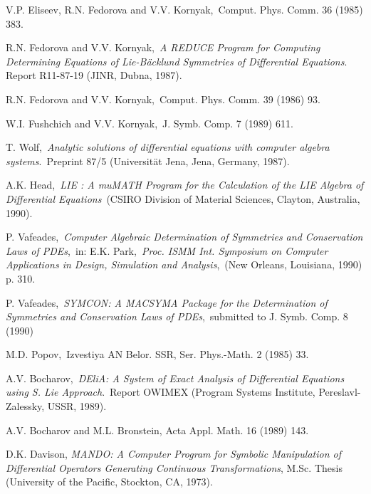 {\begin{thebibliography}{99}
 {\sc V.P. Eliseev, R.N. Fedorova} and
{\sc V.V. Kornyak},\, Comput. Phys. Comm. 36 (1985) 383.

 {\sc R.N. Fedorova} and
{\sc V.V. Kornyak},\,
{\em A REDUCE Program for Computing Determining Equations of 
Lie-B\"{a}cklund Symmetries of Differential Equations}.\,
Report R11-87-19 (JINR, Dubna, 1987).

 {\sc R.N. Fedorova} and
{\sc V.V. Kornyak},\, Comput. Phys. Comm. 39 (1986) 93.

 {\sc W.I. Fushchich} and
{\sc V.V. Kornyak},\, J. Symb. Comp. 7 (1989) 611.

 {\sc T. Wolf},\,
{\em Analytic solutions of differential equations with computer algebra
systems}.\,
Preprint 87/5 (Universit\"{a}t Jena, Jena, Germany, 1987).

 {\sc A.K. Head},\, {\em LIE : A muMATH Program
for the Calculation of the LIE Algebra of Differential Equations}\,
(CSIRO Division of Material Sciences, Clayton, Australia, 1990).

 {\sc P. Vafeades},\, {\em Computer Algebraic
Determination of Symmetries and Conservation Laws of PDEs},\,
in: E.K. Park,\, {\em Proc. ISMM Int. Symposium on Computer Applications 
in Design, Simulation and Analysis},\,
(New Orleans, Louisiana, 1990)\, p. 310.

 {\sc P. Vafeades},\, {\em SYMCON: A MACSYMA
Package for the Determination of Symmetries and Conservation Laws of PDEs},\,
submitted to J. Symb. Comp. 8 (1990)

 {\sc M.D. Popov},\,
Izvestiya AN Belor. SSR, Ser. Phys.-Math. 2 (1985) 33.

 {\sc A.V. Bocharov},\,
{\em DEliA: A System of Exact Analysis of Differential Equations using
S. Lie Approach}.\, Report OWIMEX (Program Systems Institute, 
Pereslavl-Zalessky, USSR, 1989).

 {\sc A.V. Bocharov} and 
{\sc M.L. Bronstein}, Acta Appl. Math. 16 (1989) 143.

 {\sc D.K. Davison}, 
{\em MANDO: A Computer Program for Symbolic Manipulation of Differential
Operators Generating Continuous Transformations}, 
M.Sc. Thesis (University of the Pacific, Stockton, CA, 1973).

\newpage


\end{thebibliography}}
